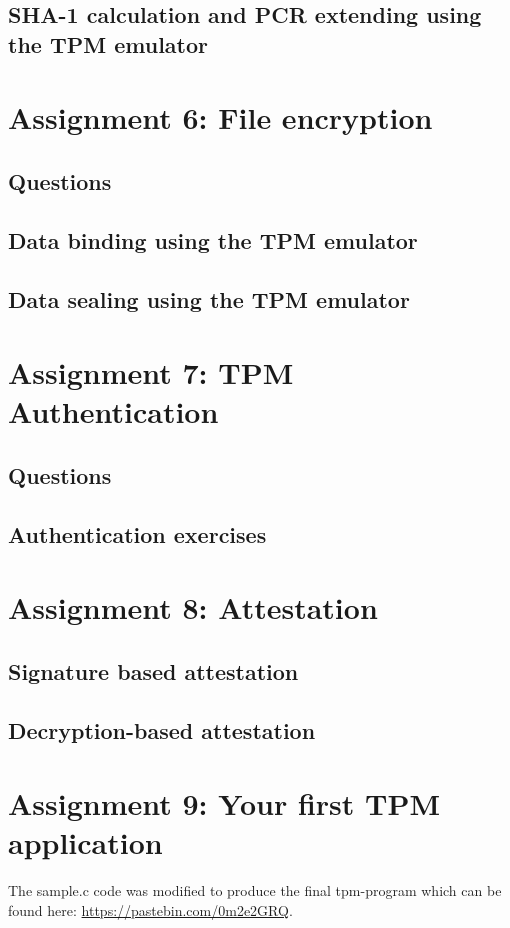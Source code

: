 \documentclass[10pt]{article}
\begin{document}
\subsection{SHA-1 calculation and PCR extending using the TPM emulator}
\section{Assignment 6: File encryption}
\subsection{Questions}
\subsection{Data binding using the TPM emulator}
\subsection{Data sealing using the TPM emulator}
\section{Assignment 7: TPM Authentication}
\subsection{Questions}
\subsection{Authentication exercises}
\section{Assignment 8: Attestation}
\subsection{Signature based attestation}
\subsection{Decryption-based attestation}
\section{Assignment 9: Your first TPM application}

The sample.c code was modified to produce the final tpm-program which can be
found here: \url{https://pastebin.com/0m2e2GRQ}.
\end{document}
